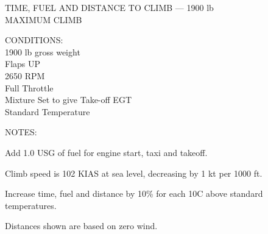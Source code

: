 \begin{figure}[t]
\begin{center}
\begin{perfhdr}TIME, FUEL AND DISTANCE TO CLIMB --- 1900 lb\\
MAXIMUM CLIMB\\
\end{perfhdr}
\Large
\normalsize \vspace{5ex} 
\raggedright 
    CONDITIONS:\\
    1900 lb gross weight\\
    Flaps UP\\
    2650 RPM\\
    Full Throttle\\
    Mixture Set to give Take-off EGT\\
    Standard Temperature\\

\hfill

\vspace{\perfnoteskip}
    \raggedright NOTES:
    \begin{enumerate*}
      \item Add 1.0 USG of fuel for engine start, taxi and takeoff.
      \item Climb speed is 102 KIAS at sea level, decreasing by 1 kt per 1000 ft.
      \item Increase time, fuel and distance by 10\% for each 10\textdegree C above standard
      temperatures.
      \item Distances shown are based on zero wind.
      \end{enumerate*}

\vspace{\perfnoteskip}
\settowidth{\colOne}{WEIGHT}
\settowidth{\colTwo}{PRESS.}
\settowidth{\colThree}{TEMP}
\settowidth{\colFour}{CLIMB}
\settowidth{\colFive}{RATE OF}
\settowidth{\colSix}{TIME}
\settowidth{\colSeven}{USED}
\settowidth{\colEight}{DIST.}


\end{center}
\end{figure}
